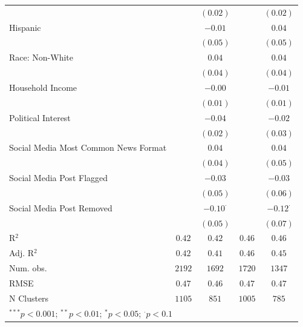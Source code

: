 \begin{table}[!htpb]
\begin{center}
{\begin{tabular}{l c c c c}
                                     &               & $(0.02)$        &               & $(0.02)$        \\
Hispanic                             &               & $-0.01$         &               & $0.04$          \\
                                     &               & $(0.05)$        &               & $(0.05)$        \\
Race: Non-White                      &               & $0.04$          &               & $0.04$          \\
                                     &               & $(0.04)$        &               & $(0.04)$        \\
Household Income                     &               & $-0.00$         &               & $-0.01$         \\
                                     &               & $(0.01)$        &               & $(0.01)$        \\
Political Interest                   &               & $-0.04$         &               & $-0.02$         \\
                                     &               & $(0.02)$        &               & $(0.03)$        \\
Social Media Most Common News Format &               & $0.04$          &               & $0.04$          \\
                                     &               & $(0.04)$        &               & $(0.05)$        \\
Social Media Post Flagged            &               & $-0.03$         &               & $-0.03$         \\
                                     &               & $(0.05)$        &               & $(0.06)$        \\
Social Media Post Removed            &               & $-0.10^{\cdot}$ &               & $-0.12^{\cdot}$ \\
                                     &               & $(0.05)$        &               & $(0.07)$        \\
\hline
R$^2$                                & $0.42$        & $0.42$          & $0.46$        & $0.46$          \\
Adj. R$^2$                           & $0.42$        & $0.41$          & $0.46$        & $0.45$          \\
Num. obs.                            & $2192$        & $1692$          & $1720$        & $1347$          \\
RMSE                                 & $0.47$        & $0.46$          & $0.47$        & $0.47$          \\
N Clusters                           & $1105$        & $851$           & $1005$        & $785$           \\
\hline
\multicolumn{5}{l}{\scriptsize{$^{***}p<0.001$; $^{**}p<0.01$; $^{*}p<0.05$; $^{\cdot}p<0.1$}}
\end{tabular}
}
\label{tab:mainmodel-mainspecification-harm-weighted-clusteredses-ld}
\end{center}
\end{table}
